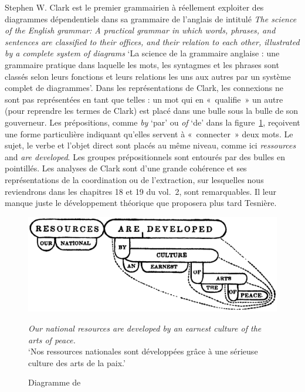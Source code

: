 {    Stephen W. Clark est le premier grammairien à réellement exploiter des diagrammes dépendentiels dans sa grammaire de l’anglais de \citeyear{Clark1847} intitulé \textit{The science of the English grammar: A practical grammar in which words, phrases, and sentences are classified to their offices, and their relation to each other, illustrated by a complete system of diagrams} ‘La science de la grammaire anglaise : une grammaire pratique dans laquelle les mots, les syntagmes et les phrases sont classés selon leurs fonctions et leurs relations les uns aux autres par un système complet de diagrammes’. Dans les représentations de Clark, les connexions ne sont pas représentées en tant que telles : un mot qui en «~qualifie~» un autre (pour reprendre les termes de Clark) est placé dans une bulle sous la bulle de son gouverneur. Les prépositions, comme \textit{by} ‘par’ ou \textit{of} ‘de’ dans la figure~\ref{fig:Clark1847}, reçoivent une forme particulière indiquant qu’elles servent à «~connecter~» deux mots. Le sujet, le verbe et l’objet direct sont placés au même niveau, comme ici \textit{ressources} and \textit{are developed}. Les groupes prépositionnels sont entourés par des bulles en pointillés. Les analyses de Clark sont d’une grande cohérence et ses représentations de la coordination ou de l’extraction, sur lesquelles nous reviendrons dans les chapitres 18 et 19 du vol.\ 2, sont remarquables. Il leur manque juste le développement théorique que proposera plus tard Tesnière.%
   
   
    \begin{figure}[H]
    \caption{Diagramme de \citet[17]{Clark1847}\label{fig:Clark1847}}
    \includegraphics[width=.75\textwidth]{figures/Clark1847.png}\smallskip\\    
    \noindent\parbox{.75\textwidth}{\small\textit{Our national resources are developed by an earnest culture of the arts of peace.}\\
    ‘Nos ressources nationales sont développées grâce à une sérieuse culture des arts de la paix.’}
    \end{figure}
    
}
